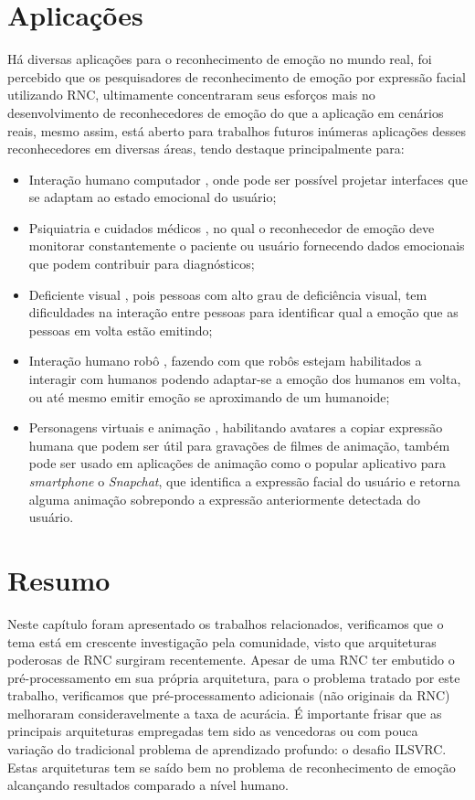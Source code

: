 


\section{Aplicações}\label{sec:apl}
Há diversas aplicações para o reconhecimento de emoção no mundo real, foi percebido que os pesquisadores de reconhecimento de emoção por expressão facial utilizando RNC, ultimamente concentraram seus esforços mais no desenvolvimento de reconhecedores de emoção do que a aplicação em cenários reais, mesmo assim, está aberto para trabalhos futuros inúmeras aplicações desses reconhecedores em diversas áreas, tendo destaque principalmente para: 

\begin{itemize}
\item Interação humano computador \citep{art1, art3, art5, art8}, onde pode ser possível projetar interfaces que se adaptam ao estado emocional do usuário;
\item Psiquiatria e cuidados médicos \citep{art1, art3, art12}, no qual o reconhecedor de emoção deve monitorar constantemente o paciente ou usuário fornecendo dados emocionais que podem contribuir para diagnósticos;
\item Deficiente visual \citep{art15}, pois pessoas com alto grau de deficiência visual, tem dificuldades na interação entre pessoas para identificar qual a emoção que as pessoas em volta estão emitindo;
\item Interação humano robô \citep{art6, art14}, fazendo com que robôs estejam habilitados a interagir com humanos podendo adaptar-se a emoção dos humanos em volta, ou até mesmo emitir emoção se aproximando de um humanoide;
\item Personagens virtuais e animação \citep{art9, art11}, habilitando avatares a copiar expressão humana que podem ser útil para gravações de filmes de animação, também pode ser usado em aplicações de animação como o popular aplicativo para \textit{smartphone} o \textit{Snapchat}, que identifica a expressão facial do usuário e retorna alguma animação sobrepondo a expressão anteriormente detectada do usuário.
\end{itemize}

\section{Resumo}\label{sec:cons}
Neste capítulo foram apresentado os trabalhos relacionados, verificamos que o tema está em crescente investigação pela comunidade, visto que arquiteturas poderosas de RNC surgiram recentemente. Apesar de uma RNC ter embutido o pré-processamento em sua própria arquitetura, para o problema tratado por este trabalho, verificamos que pré-processamento adicionais (não originais da RNC) melhoraram consideravelmente a taxa de acurácia. É importante frisar que as principais arquiteturas empregadas tem sido as vencedoras ou com pouca variação do tradicional problema de aprendizado profundo: o desafio ILSVRC. Estas arquiteturas tem se saído bem no problema de reconhecimento de emoção alcançando resultados comparado a nível humano.

